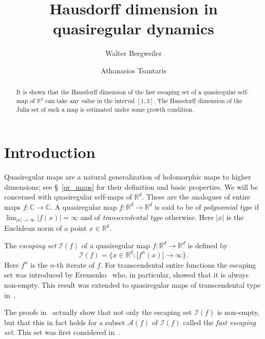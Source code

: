 \documentclass[12pt,a4paper]{amsart}
\title{Hausdorff dimension in quasiregular dynamics}
\author{Walter Bergweiler}
\author{Athanasios Tsantaris}
\date{}
\theoremstyle{plain}
\theoremstyle{definition}
\theoremstyle{remark}
\def\C{\mathbb C}
\def\R{\mathbb R}
\def\cA{\mathcal A}
\def\cI{\mathcal I}
\numberwithin{equation}{section}
\begin{document}
\begin{abstract}
It is shown that the Hausdorff dimension of the fast escaping set of a 
quasiregular self-map of ${\mathbb R}^3$ can take any value in the interval $[1,3]$.
The Hausdorff dimension of the Julia set of such a map is estimated under some
growth condition.
\end{abstract}
\maketitle
\section{Introduction} \label{intro}
Quasiregular maps are a natural generalization of holomorphic maps to higher dimensions;
see \S~\ref{qr_maps} for their definition and basic properties.
We will be concerned with quasiregular self-maps of $\R^d$. These are the
analogues of entire maps $f\colon\C\to\C$. A  quasiregular map
$f\colon\R^d\to\R^d$  is said to be of \emph{polynomial type} if
$\lim_{|x|\to\infty}|f(x)|=\infty$ and of \emph{transcendental type} otherwise.
Here $|x|$ is the Euclidean norm of a point $x\in\R^d$.

The \emph{escaping set}
$\cI(f)$ of a quasiregular map $f\colon\R^d\to\R^d$ is defined by
\begin{equation} \label{0a}
\cI(f) = \{ x \in \R^d \colon |f^n(x)| \to \infty \}.
\end{equation}
Here $f^n$ is the $n$-th iterate of $f$. For transcendental entire functions 
the escaping set was introduced by Eremenko~\cite{Eremenko1989}
who, in particular, showed that it is always non-empty.
This result was extended to quasiregular maps of transcendental type in~\cite{BFLM}.

The proofs in~\cite{BFLM,Eremenko1989} actually show that not only the escaping
set $\cI(f)$ is non-empty, but that this in fact holds for a subset $\cA(f)$ of $\cI(f)$
called the \emph{fast escaping set}.
This set was first considered in~\cite{BH}.
\end{document}
